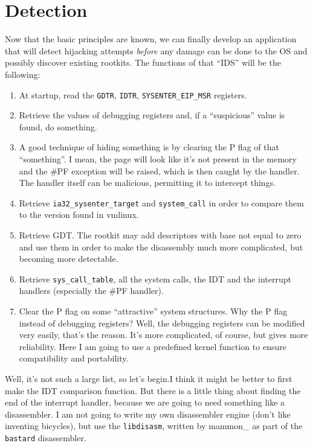 \documentclass[12pt]{book}
\begin{document}
\chapter{Detection}
Now that the basic principles are known, we can finally develop an
application that will detect hijacking attempts \emph{before} any
damage can be done to the OS and possibly discover existing
rootkits. The functions of that ``IDS'' will be the following:
\begin{enumerate}
  \item At startup, read the \verb!GDTR!, \verb!IDTR!, \verb!SYSENTER_EIP_MSR!
    registers.
    
  \item Retrieve the values of debugging registers and, if
    a ``suspicious'' value is found, do something.
    
  \item A good technique of hiding something is by clearing the P flag
    of that ``something''. I mean, the page will look like it's not
    present in the memory and the \#PF exception will be raised, which
    is then caught by the handler. The handler itself can be
    malicious, permitting it to intercept things.

  \item Retrieve \verb!ia32_sysenter_target! and \verb!system_call! in
    order to compare them to the version found in vmlinux.

  \item Retrieve GDT. The rootkit may add descriptors with base not
    equal to zero and use them in order to make the disassembly much
    more complicated, but becoming more detectable.

  \item Retrieve \verb!sys_call_table!, all the system calls, the IDT
    and the interrupt handlers (especially the \#PF handler).

  \item Clear the P flag on some ``attractive'' system structures. Why
    the P flag instead of debugging registers? Well, the debugging
    registers can be modified very easily, that's the reason. It's
    more complicated, of course, but gives more reliability. Here I am
    going to use a predefined kernel function to ensure compatibility
    and portability.
\end{enumerate}
Well, it's not such a large list, so let's begin.I think it might be
better to first make the IDT comparison function. But there is a
little thing about finding the end of the interrupt handler, because
we are going to need something like a disassembler. I am not going to
write my own disassembler engine (don't like inventing bicycles), but
use the \verb!libdisasm!, written by mammon\_ as part of the
\verb!bastard! disassembler. 

\printindex[todo]
%
\end{document}
